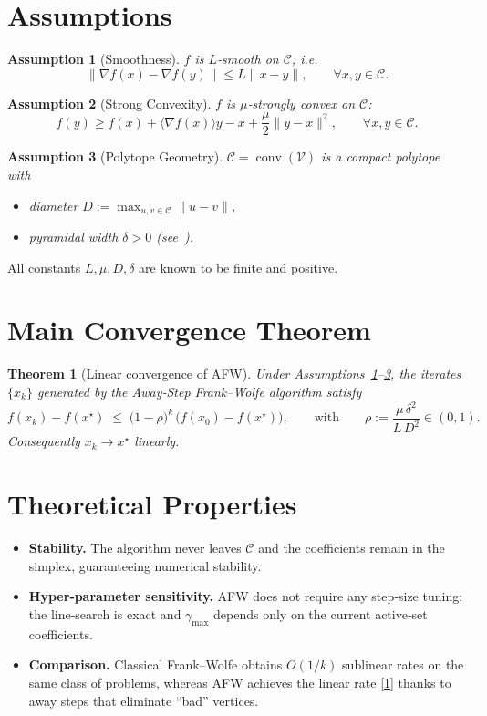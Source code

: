 \documentclass{article}
\newtheorem{theorem}{Theorem}
\newtheorem{assumption}{Assumption}
\newcommand{\Cset}{\mathcal{C}}
\newcommand{\grad}{\nabla}
\newcommand{\inner}[1]{\langle #1\rangle}
\begin{document}
\section*{Assumptions}
\begin{assumption}[Smoothness]\label{ass:smooth}
$f$ is $L$‑smooth on $\Cset$, i.e.
\[
\|\grad f(x)-\grad f(y)\| \le L\|x-y\|,\qquad\forall x,y\in\Cset .
\]
\end{assumption}
\begin{assumption}[Strong Convexity]\label{ass:strong}
$f$ is $\mu$‑strongly convex on $\Cset$:
\[
f(y) \ge f(x)+\inner{\grad f(x)}{y-x}+\frac{\mu}{2}\|y-x\|^{2},
\qquad\forall x,y\in\Cset .
\]
\end{assumption}
\begin{assumption}[Polytope Geometry]\label{ass:polytope}
$\Cset=\operatorname{conv}(\mathcal{V})$ is a compact polytope with
\begin{itemize}
\item diameter $D:=\max_{u,v\in\Cset}\|u-v\|$,
\item pyramidal width $\delta>0$ (see~\cite{lacoste2015linear}).
\end{itemize}
\end{assumption}
All constants $L,\mu,D,\delta$ are known to be finite and positive.

\section*{Main Convergence Theorem}
\begin{theorem}[Linear convergence of AFW]\label{thm:linear}
Under Assumptions~\ref{ass:smooth}--\ref{ass:polytope}, the iterates $\{x_{k}\}$ generated
by the Away‑Step Frank–Wolfe algorithm satisfy
\[
f(x_{k})-f(x^{\star})\;\le\;\bigl(1-\rho\bigr)^{k}\,\bigl(f(x_{0})-f(x^{\star})\bigr),
\qquad\text{with}\qquad
\rho:=\frac{\mu\,\delta^{2}}{L\,D^{2}} \in (0,1).
\tag{1}
\]
Consequently $x_{k}\to x^{\star}$ linearly.
\end{theorem}

\section*{Theoretical Properties}
\begin{itemize}
\item \textbf{Stability.} The algorithm never leaves $\Cset$ and the coefficients
remain in the simplex, guaranteeing numerical stability.
\item \textbf{Hyper‑parameter sensitivity.} AFW does not require any step‑size
tuning; the line‑search is exact and $\gamma_{\max}$ depends only on the current
active‑set coefficients.
\item \textbf{Comparison.} Classical Frank–Wolfe obtains $O(1/k)$ sublinear
rates on the same class of problems, whereas AFW achieves the linear rate
\eqref{1} thanks to away steps that eliminate ``bad'' vertices.
\end{itemize}
\end{document}
